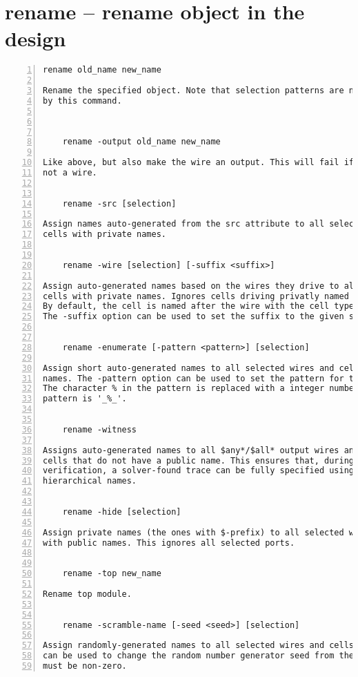 \section{rename -- rename object in the design}
\label{cmd:rename}
\begin{lstlisting}[numbers=left,frame=single]
    rename old_name new_name

Rename the specified object. Note that selection patterns are not supported
by this command.



    rename -output old_name new_name

Like above, but also make the wire an output. This will fail if the object is
not a wire.


    rename -src [selection]

Assign names auto-generated from the src attribute to all selected wires and
cells with private names.


    rename -wire [selection] [-suffix <suffix>]

Assign auto-generated names based on the wires they drive to all selected
cells with private names. Ignores cells driving privatly named wires.
By default, the cell is named after the wire with the cell type as suffix.
The -suffix option can be used to set the suffix to the given string instead.


    rename -enumerate [-pattern <pattern>] [selection]

Assign short auto-generated names to all selected wires and cells with private
names. The -pattern option can be used to set the pattern for the new names.
The character % in the pattern is replaced with a integer number. The default
pattern is '_%_'.


    rename -witness

Assigns auto-generated names to all $any*/$all* output wires and containing
cells that do not have a public name. This ensures that, during formal
verification, a solver-found trace can be fully specified using a public
hierarchical names.


    rename -hide [selection]

Assign private names (the ones with $-prefix) to all selected wires and cells
with public names. This ignores all selected ports.


    rename -top new_name

Rename top module.


    rename -scramble-name [-seed <seed>] [selection]

Assign randomly-generated names to all selected wires and cells. The seed option
can be used to change the random number generator seed from the default, but it
must be non-zero.
\end{lstlisting}

